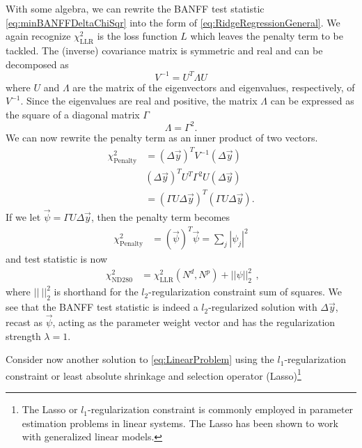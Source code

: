 With some algebra, we can rewrite the BANFF test statistic \eqref{eq:minBANFFDeltaChiSqr}
into the form of \eqref{eq:RidgeRegressionGeneral}. We again recognize
$\chi_{\text{LLR}}^{2}$ is the loss function $L$ which leaves the
penalty term to be tackled. The (inverse) covariance matrix is symmetric
and real and can be decomposed as
\[
V^{-1}=U^{T}\Lambda U
\]
where $U$ and $\Lambda$ are the matrix of the eigenvectors and eigenvalues,
respectively, of $V^{-1}$. Since the eigenvalues are real and positive,
the matrix $\Lambda$ can be expressed as the square of a diagonal
matrix $\Gamma$
\[
\Lambda=\Gamma^{2}.
\]
We can now rewrite the penalty term as an inner product of two vectors.
\[
\begin{aligned}\chi_{\text{Penalty}}^{2} & =\left(\Delta\vec{y}\right)^{T}V^{-1}\left(\Delta\vec{y}\right)\\
 & \left(\Delta\vec{y}\right)^{T}U^{T}\Gamma^{2}U\left(\Delta\vec{y}\right)\\
 & =\left(\Gamma U\Delta\vec{y}\right)^{T}\left(\Gamma U\Delta\vec{y}\right).
\end{aligned}
\]
If we let $\vec{\psi}=\Gamma U\Delta\vec{y}$, then the penalty term
becomes
\[
\begin{aligned}\chi_{\text{Penalty}}^{2} & =\left(\vec{\psi}\right)^{T}\vec{\psi}=\sum_{j}\left|\psi_{j}\right|^{2}\end{aligned}
\]
and test statistic is now
\begin{equation}
\begin{aligned}\chi_{\text{ND280}}^{2} & =\chi_{\text{LLR}}^{2}\left(N^{d},N^{p}\right)+\left|\left|\psi\right|\right|_{2}^{2}\end{aligned}
,\label{eq:DeltaChiSqND280RidgeRegressionForm}
\end{equation}
where $\left|\left|\ \right|\right|_{2}^{2}$ is shorthand for the
$l_{2}$-regularization constraint sum of squares. We see that the
BANFF test statistic is indeed a $l_{2}$-regularized solution with
$\Delta\vec{y}$, recast as $\vec{\psi}$, acting as the parameter
weight vector and has the regularization strength $\lambda=1$.

Consider now another solution to \eqref{eq:LinearProblem} using the
$l_{1}$-regularization constraint or least absolute shrinkage and
selection operator (Lasso)\footnote{The Lasso or $l_{1}$-regularization constraint is commonly employed
in parameter estimation problems in linear systems. The Lasso has
been shown to work with generalized linear models\cite{JSSv033i01}.}

